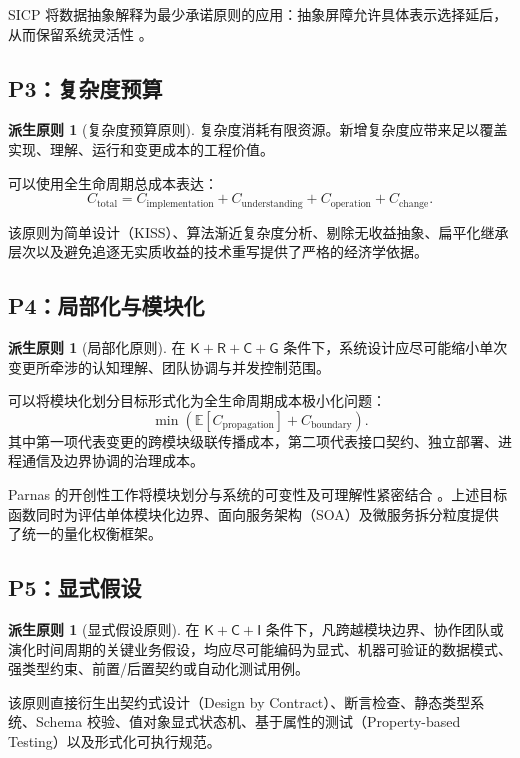 \documentclass[11pt,a4paper]{ctexart}
\numberwithin{equation}{section}
\theoremstyle{definition}
\newtheorem{principle}[definition]{派生原则}
\theoremstyle{plain}
\newcommand{\Know}{\mathsf{K}}
\newcommand{\Res}{\mathsf{R}}
\newcommand{\Ctrl}{\mathsf{C}}
\newcommand{\Info}{\mathsf{I}}
\newcommand{\Goal}{\mathsf{G}}
\begin{document}
SICP 将数据抽象解释为最少承诺原则的应用：抽象屏障允许具体表示选择延后，从而保留系统灵活性 \cite{sicp1996}。

\subsection{P3：复杂度预算}

\begin{principle}[复杂度预算原则]
复杂度消耗有限资源。新增复杂度应带来足以覆盖实现、理解、运行和变更成本的工程价值。
\end{principle}

可以使用全生命周期总成本表达：
\[
C_{\mathrm{total}}
=
C_{\mathrm{implementation}}
+
C_{\mathrm{understanding}}
+
C_{\mathrm{operation}}
+
C_{\mathrm{change}}.
\]

该原则为简单设计（KISS）、算法渐近复杂度分析、剔除无收益抽象、扁平化继承层次以及避免追逐无实质收益的技术重写提供了严格的经济学依据。

\subsection{P4：局部化与模块化}

\begin{principle}[局部化原则]
在 $\Know+\Res+\Ctrl+\Goal$ 条件下，系统设计应尽可能缩小单次变更所牵涉的认知理解、团队协调与并发控制范围。
\end{principle}

可以将模块化划分目标形式化为全生命周期成本极小化问题：
\[
\min
\left(
\mathbb{E}[C_{\mathrm{propagation}}]
+
C_{\mathrm{boundary}}
\right).
\]
其中第一项代表变更的跨模块级联传播成本，第二项代表接口契约、独立部署、进程通信及边界协调的治理成本。

Parnas 的开创性工作将模块划分与系统的可变性及可理解性紧密结合 \cite{parnas1972}。上述目标函数同时为评估单体模块化边界、面向服务架构（SOA）及微服务拆分粒度提供了统一的量化权衡框架。

\subsection{P5：显式假设}

\begin{principle}[显式假设原则]
在 $\Know+\Ctrl+\Info$ 条件下，凡跨越模块边界、协作团队或演化时间周期的关键业务假设，均应尽可能编码为显式、机器可验证的数据模式、强类型约束、前置/后置契约或自动化测试用例。
\end{principle}

该原则直接衍生出契约式设计（Design by Contract）、断言检查、静态类型系统、Schema 校验、值对象显式状态机、基于属性的测试（Property-based Testing）以及形式化可执行规范。
\end{document}
